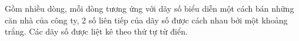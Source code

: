 Gồm nhiều dòng, mỗi dòng tương ứng với dãy số biểu diễn một cách bán những căn nhà của công ty, 2 số liên tiếp của dãy số được cách nhau bởi một khoảng trắng. Các dãy số được liệt kê theo thứ tự từ điển.